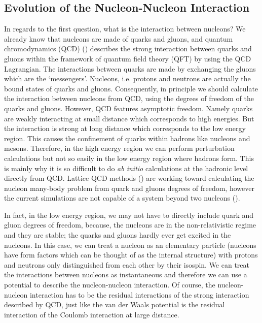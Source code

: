 \documentclass[12pt,letterpaper,UTF8]{report}
\begin{document}
\subsection{Evolution of the Nucleon-Nucleon Interaction}

In regards to the first question, what is the interaction between nucleons? We already know that nucleons are made of quarks and gluons, and quantum chromodynamics (QCD) (\cite{Wilczek73a,Polizer73a}) describes the strong interaction between quarks and gluons within the framework of quantum field theory (QFT) by using the QCD Lagrangian. The interactions between quarks are made by exchanging the gluons which are the `messengers'. Nucleons, i.e. protons and neutrons are actually the bound states of quarks and gluons.
Consequently, in principle we should calculate the interaction between nucleons from QCD, using the degrees of freedom of the quarks and gluons. However, QCD features asymptotic freedom. Namely quarks are weakly interacting at small distance which corresponds to high energies. But the interaction is strong at long distance which corresponds to the low energy region. This causes the confinement of quarks within hadrons like nucleons and mesons.
Therefore, in the high energy region we can perform perturbation calculations but not so easily in the low energy region where hadrons form. This is mainly why it is so difficult to do \textit{ab initio} calculations at the hadronic level directly from QCD. Lattice QCD methods (\cite{davies2002lattice}) are working toward calculating the nucleon many-body problem from quark and gluons degrees of freedom, however the current simulations are not capable of a system beyond two nucleons (\cite{BEANE2008,savage2015nuclear}).


In fact, in the low energy region, we may not have to directly include quark and gluon degrees of freedom, because, the nucleons are in the non-relativistic regime and they are stable; the quarks and gluons hardly ever get excited in the nucleons. In this case, we can treat a nucleon as an elementary particle (nucleons have form factors which can be thought of as the internal structure) with protons and neutrons only distinguished from each other by their isospin. We can treat the interactions between nucleons as instantaneous and therefore we can use a potential to describe the nucleon-nucleon interaction.
Of course, the nucleon-nucleon interaction has to be the residual interactions of the strong interaction described by QCD, just like the van der Waals potential is the residual interaction of the Coulomb interaction at large distance.
\end{document}
